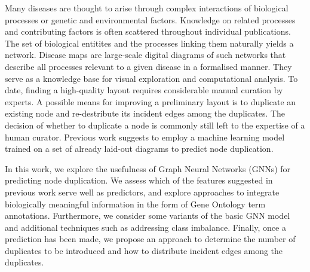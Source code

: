 \documentclass[
	fontsize=10pt, %
	twoside=false, %
	secnumdepth=1, %
  toc=indentunnumbered %
]{kaobook}
\begin{document}
Many diseases are thought to arise through complex interactions of biological
processes or genetic and environmental factors.
Knowledge on related processes and contributing factors
is often scattered throughout individual publications.
%
The set of biological entitites and the processes linking them naturally yields
a network.
Disease maps are large-scale digital diagrams of such networks that
describe all processes relevant to a given disease in a formalised manner.
They serve as a
knowledge base for visual exploration and computational analysis.
%
To date, finding a high-quality layout requires considerable manual
curation by experts.
A possible means for improving a preliminary layout is to duplicate an
existing node and re-destribute its incident edges among the duplicates.
The decision of whether to duplicate a node is commonly still left to the
expertise of a human curator. Previous work
suggests to employ a machine learning
model trained on a set of already laid-out diagrams to predict node duplication.

In this work, we explore the usefulness of Graph Neural Networks (GNNs) for
predicting node duplication.
%
We assess which
of the features suggested in previous work
serve well as predictors,
%
and explore approaches to integrate biologically meaningful information in the
form of Gene Ontology term annotations.
%
Furthermore, we consider some variants of the basic GNN model and
additional techniques such as addressing class imbalance.
%
Finally, once a prediction has been made, we propose an approach to determine
the number of duplicates to be introduced and how to distribute incident edges
among the duplicates.
\end{document}
